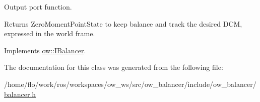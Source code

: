 Output port function. 

\begin{DoxyReturn}{Returns}
Zero\+Moment\+Point\+State to keep balance and track the desired D\+CM, expressed in the world frame. 
\end{DoxyReturn}


Implements \hyperlink{classow_1_1IBalancer_a7867ad2c24f117fa80d5cbf5074686ee}{ow\+::\+I\+Balancer}.



The documentation for this class was generated from the following file\+:\begin{DoxyCompactItemize}
\item 
/home/flo/work/ros/workspaces/ow\+\_\+ws/src/ow\+\_\+balancer/include/ow\+\_\+balancer/\hyperlink{balancer_8h}{balancer.\+h}\end{DoxyCompactItemize}
